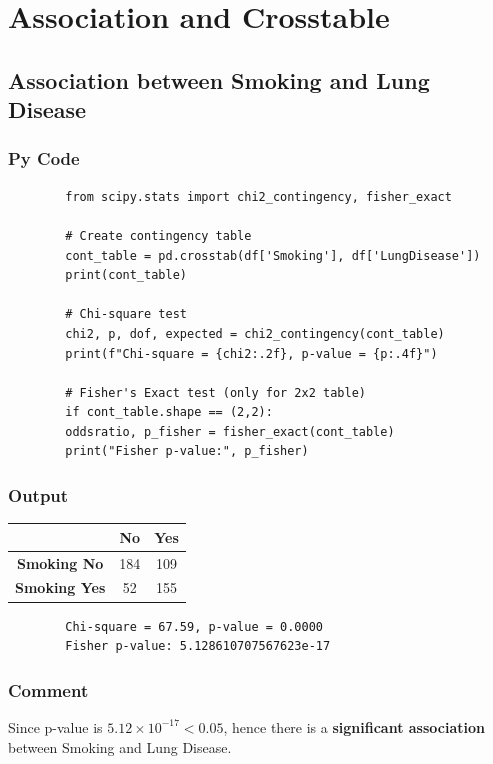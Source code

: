 \documentclass[a4paper,12pt]{article}
\begin{document}
	
	\section{Association and Crosstable}
	
	\subsection{Association between Smoking and Lung Disease}
	
	\subsubsection{Py Code}
	\begin{lstlisting}
		from scipy.stats import chi2_contingency, fisher_exact
		
		# Create contingency table
		cont_table = pd.crosstab(df['Smoking'], df['LungDisease'])
		print(cont_table)
		
		# Chi-square test
		chi2, p, dof, expected = chi2_contingency(cont_table)
		print(f"Chi-square = {chi2:.2f}, p-value = {p:.4f}")
		
		# Fisher's Exact test (only for 2x2 table)
		if cont_table.shape == (2,2):
		oddsratio, p_fisher = fisher_exact(cont_table)
		print("Fisher p-value:", p_fisher)
	\end{lstlisting}
	
	\subsubsection{Output}
	\begin{center}
		\begin{tabular}{|c|c|c|}
			\hline
			& \textbf{No} & \textbf{Yes} \\
			\hline
			\textbf{Smoking No} & 184 & 109 \\
			\textbf{Smoking Yes} & 52 & 155 \\
			\hline
		\end{tabular}
	\end{center}
	
	\begin{verbatim}
		Chi-square = 67.59, p-value = 0.0000
		Fisher p-value: 5.128610707567623e-17
	\end{verbatim}
	
	\subsubsection{Comment}
	Since p-value is \(5.12 \times 10^{-17} < 0.05\), hence there is a \textbf{significant association} between Smoking and Lung Disease.
\end{document}
